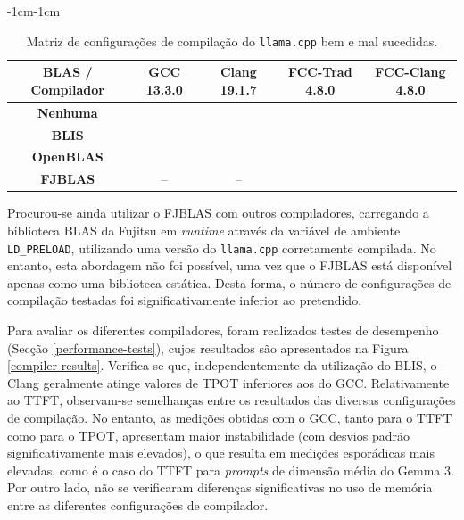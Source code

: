 \documentclass[11pt, a4paper]{article}
\newcommand{\cmark}{\ding{51}}
\newcommand{\xmark}{\ding{55}}
\begin{document}
\begin{table}[H]
    \centering
    \begin{adjustwidth}{-1cm}{-1cm}
        \centering
        \begin{tabular}{|c|c|c|c|c|}
            \hline
            \textbf{BLAS / Compilador} &
            \textbf{GCC 13.3.0}        &
            \textbf{Clang 19.1.7}      &
            \textbf{FCC-Trad 4.8.0}    &
            \textbf{FCC-Clang 4.8.0}   \\ \hline

            \textbf{Nenhuma}  & \cmark & \cmark & \xmark & \xmark \\ \hline
            \textbf{BLIS}     & \cmark & \cmark & \xmark & \xmark \\ \hline
            \textbf{OpenBLAS} & \xmark & \xmark & \xmark & \xmark \\ \hline
            \textbf{FJBLAS}   & --     &     -- & \xmark & \xmark \\ \hline
        \end{tabular}
    \end{adjustwidth}

    \caption{Matriz de configurações de compilação do \texttt{llama.cpp} bem e mal sucedidas.}
    \label{build-matrix}
\end{table}

Procurou-se ainda utilizar o FJBLAS com outros compiladores, carregando a biblioteca BLAS da Fujitsu
em \emph{runtime} através da variável de ambiente \texttt{LD\_PRELOAD}, utilizando uma versão do
\texttt{llama.cpp} corretamente compilada. No entanto, esta abordagem não foi possível, uma vez que
o FJBLAS está disponível apenas como uma biblioteca estática. Desta forma, o número de configurações
de compilação testadas foi significativamente inferior ao pretendido.

Para avaliar os diferentes compiladores, foram realizados testes de desempenho (Secção
\ref{performance-tests}), cujos resultados são apresentados na Figura \ref{compiler-results}.
Verifica-se que, independentemente da utilização do BLIS, o Clang geralmente atinge valores de TPOT
inferiores aos do GCC. Relativamente ao TTFT, observam-se semelhanças entre os resultados das
diversas configurações de compilação. No entanto, as medições obtidas com o GCC, tanto para o TTFT
como para o TPOT, apresentam maior instabilidade (com desvios padrão significativamente mais
elevados), o que resulta em medições esporádicas mais elevadas, como é o caso do TTFT para
\emph{prompts} de dimensão média do Gemma 3. Por outro lado, não se verificaram diferenças
significativas no uso de memória entre as diferentes configurações de compilador.
\end{document}
